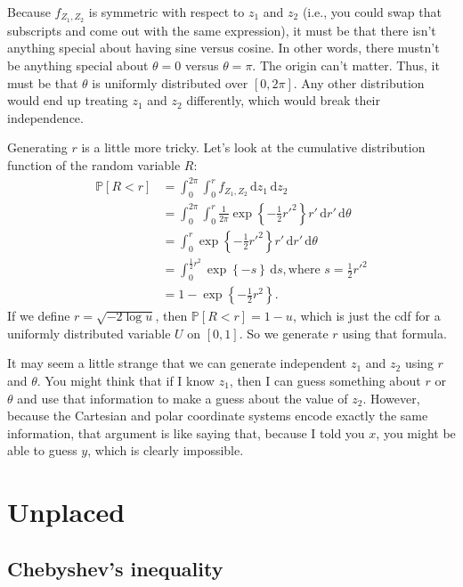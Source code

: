 \documentclass{book}
\begin{document}
Because \(f_{Z_1,Z_2}\) is symmetric with respect to \(z_1\) and \(z_2\)
(i.e., you could swap that subscripts and come out with the same
expression), it must be that there isn't anything special about having
sine versus cosine. In other words, there mustn't be anything special
about \(\theta = 0\) versus \(\theta = \pi\). The origin can't matter.
Thus, it must be that \(\theta\) is uniformly distributed over
\([0, 2\pi]\). Any other distribution would end up treating \(z_1\) and
\(z_2\) differently, which would break their independence.

Generating \(r\) is a little more tricky. Let's look at the cumulative
distribution function of the random variable \(R\): \[
\begin{aligned}
\mathbb{P}[R < r] &= \int_0^{2\pi} \int_0^r f_{Z_1, Z_2}
    \,\mathrm{d}z_1 \, \mathrm{d}z_2 \\
  &= \int_0^{2\pi} \int_0^r \frac{1}{2\pi} \exp\left\{-\frac{1}{2} r'^2\right\}
    r' \,\mathrm{d}{r'} \,\mathrm{d}\theta \\
  &= \int_0^r \exp\left\{-\frac{1}{2} r'^2\right\}
    r' \,\mathrm{d}{r'} \,\mathrm{d}\theta \\
  &= \int_0^{\tfrac{1}{2} r^2} \exp\left\{-s\right\} \,\mathrm{d}s,
    \text{where $s = \tfrac{1}{2} r'^2$} \\
  &= 1 - \exp\left\{ -\frac{1}{2} r^2 \right\}.
\end{aligned}
\] If we define \(r = \sqrt{-2 \log u}\), then
\(\mathbb{P}[R < r] = 1 - u\), which is just the cdf for a uniformly
distributed variable \(U\) on \([0, 1]\). So we generate \(r\) using
that formula.

It may seem a little strange that we can generate independent \(z_1\)
and \(z_2\) using \(r\) and \(\theta\). You might think that if I know
\(z_1\), then I can guess something about \(r\) or \(\theta\) and use
that information to make a guess about the value of \(z_2\). However,
because the Cartesian and polar coordinate systems encode exactly the
same information, that argument is like saying that, because I told you
\(x\), you might be able to guess \(y\), which is clearly impossible.

\section{Unplaced}\label{unplaced}

\subsection{Chebyshev's inequality}\label{chebyshevs-inequality}
\end{document}
